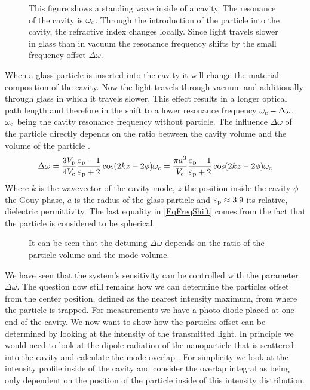 \begin{figure}[H]
	
	\caption{This figure shows a standing wave inside of a cavity. The resonance of the cavity is $\de{\omega}{c}$. Through the introduction of the particle into the cavity, the refractive index changes locally. Since light travels slower in glass than in vacuum the resonance frequency shifts by the small frequency offset $\Delta\omega$.}
	\label{fig:CavityDetection}
\end{figure}

When a glass particle is inserted into the cavity it will change the material composition of the cavity. Now the light travels through vacuum and additionally through glass in which it travels slower. This effect results in a longer optical path length and therefore in the shift to a lower resonance frequency $\de{\omega}{c}-\Delta\omega$, $\de{\omega}{c}$ being the cavity resonance frequency without particle. The influence $\Delta\omega$ of the particle directly depends on the ratio between the cavity volume and the volume of the particle \cite{chang2010cavity}.
\begin{equation}\label{EqFreqShift}
	\Delta\omega=\frac{3\de{V}{p}}{4\de{V}{c}}\frac{\de{\varepsilon}{p}-1}{\de{\varepsilon}{p}+2}\cos(2kz-2\phi)\de{\omega}{c}=\frac{\pi a^3}{\de{V}{c}}\frac{\de{\varepsilon}{p}-1}{\de{\varepsilon}{p}+2}\cos(2kz-2\phi)\de{\omega}{c}
\end{equation}
Where $k$ is the wavevector of the cavity mode, $z$ the position inside the cavity $\phi$ the Gouy phase, $a$ is the radius of the glass particle and $\de{\varepsilon}{p}\approx 3.9$ its relative, dielectric permittivity. The last equality in \autoref{EqFreqShift} comes from the fact that the particle is considered to be spherical.

\begin{figure}[H]
	
	\caption{It can be seen that the detuning $\Delta\omega$ depends on the ratio of the particle volume and the mode volume.}
	\label{fig:FreqShift}
\end{figure}

We have seen that the system's sensitivity can be controlled with the parameter $\Delta\omega$. The question now still remains how we can determine the particles offset from the center position, defined as the nearest intensity maximum, from where the particle is trapped. For measurements we have a photo-diode placed at one end of the cavity. We now want to show how the particles offset can be determined by looking at the intensity of the transmitted light. In principle we would need to look at the dipole radiation of the nanoparticle that is scattered into the cavity and calculate the mode overlap \cite{chang2010cavity}. For simplicity we look at the intensity profile inside of the cavity and consider the overlap integral as being only dependent on the position of the particle inside of this intensity distribution.

